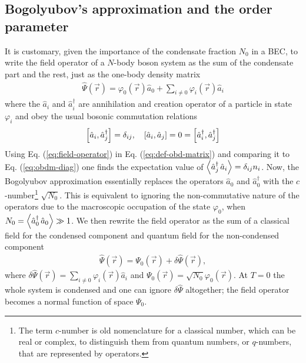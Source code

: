 		\subsection{Bogolyubov's approximation and the order parameter}\label{sec:bogol-order}
			It is customary, given the importance of the condensate fraction $N_0$ in a BEC, to write the field operator of a $N$-body boson system as the sum of the condensate part and the rest, just as the one-body density matrix
			\begin{align}
				\hat{\Psi}(\vec{r})=\varphi_0(\vec{r})\hat{a}_0 + \sum_{i\neq 0} \varphi_i(\vec{r})\hat{a}_i \label{eq:field-operator}
			\end{align}
			where the $\hat{a}_i$ and $\hat{a}_i^\dagger$ are annihilation and creation operator of a particle in state $\varphi_i$ and obey the usual bosonic commutation relations
			\begin{align}
				\commutator{\hat{a}_i}{\hat{a}_j^\dagger}=\delta_{ij},\quad 	\commutator{\hat{a}_i}{\hat{a}_j}=0=\commutator{\hat{a}_i^\dagger}{\hat{a}_j^\dagger}
			\end{align}
			Using Eq. (\ref{eq:field-operator}) in Eq. (\ref{eq:def-obd-matrix}) and comparing it to Eq. (\ref{eq:obdm-diag}) one finds the expectation value of $\expectationvalue{\hat{a}_j^\dagger\,\hat{a}_i}=\delta_{ij}n_i$. Now, the Bogolyubov approximation essentially replaces the operators $\hat{a}_0$ and $\hat{a}_0^\dagger$ with the $c$-number\footnote{The term $c$-number is old nomenclature for a classical number, which can be real or complex, to distinguish them from quantum numbers, or $q$-numbers, that are represented by operators.} $\sqrt{N_0}$. This is equivalent to ignoring the non-commutative nature of the operators due to the macroscopic occupation of the state $\varphi_0$, when $N_0=\expectationvalue{\hat{a}_0^\dagger\,\hat{a}_0}\gg 1$. We then rewrite the field operator as the sum of a classical field for the condensed component and quantum field for the non-condensed component
			\begin{align}
				\hat{\Psi}(\vec{r})=\Psi_0(\vec{r})+\delta\hat{\Psi}(\vec{r}),\label{eq:order-param-real}
			\end{align}
			where $\delta\hat{\Psi}(\vec{r})=\sum_{i\neq 0}\varphi_i(\vec{r})\hat{a}_i$ and $\Psi_0(\vec{r})=\sqrt{N_0}\varphi_0(\vec{r})$. At $T=0$ the whole system is condensed and one can ignore $\delta\hat{\Psi}$ altogether; the field operator becomes a normal function of space $\Psi_0$.
			
